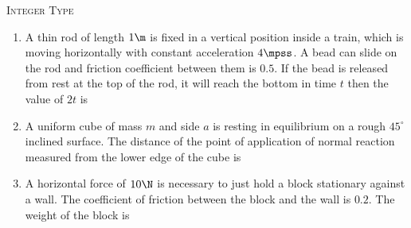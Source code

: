 \documentclass{article}
\renewcommand{\ansint}[1]{\underline{\hspace{2cm}}}
\begin{document}
\begin{center}
    \textsc{Integer Type}
\end{center}

\begin{enumerate}\addtocounter{enumi}{15}
\item A thin rod of length $1 \m$ is fixed in a vertical position inside a train, which is moving horizontally with constant acceleration $4 \mpss$. A bead can slide on the rod and friction coefficient between them is $0.5$. If the bead is released from rest at the top of the rod, it will reach the bottom in time $t$ then the value of $2t$ is \ansint{1}
    
\item A uniform cube of mass $m$ and side $a$ is resting in equilibrium on a rough $45^\circ$ inclined surface. The distance of the point of application of normal reaction measured from the lower edge of the cube is \ansint{0}
    
\item A horizontal force of $10 \N$ is necessary to just hold a block stationary against a wall. The coefficient of friction between the block and the wall is $0.2$. The weight of the block is \ansint{2}
\end{enumerate}


\pagebreak


\end{document}
